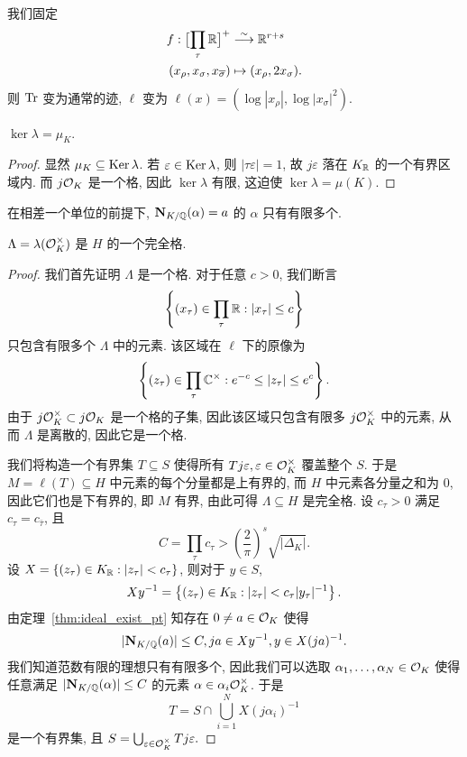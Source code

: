 我们固定
  \[\begin{split}
f:\bigl[\prod_\tau {\mathbb{R}}\bigr]^+&\stackrel{\sim}{\longrightarrow} {\mathbb{R}}^{r+s}\\
(x_\rho,x_\sigma,x_{\overline \sigma})&\mapsto (x_\rho,2x_\sigma).
\end{split}\]
则 ${\mathrm{Tr}}$ 变为通常的迹, $\ell$ 变为 $\ell(x)=(\log|x_\rho|,\log|x_\sigma|^2).$

\begin{proposition}{}{}
$\ker\lambda=\mu_K$.
\end{proposition}
\begin{proof}
显然 $\mu_K\subseteq {\mathrm{Ker}\,}\lambda$. 若 $\varepsilon\in{\mathrm{Ker}\,}\lambda$, 则 $|\tau \varepsilon|=1$, 故 $j\varepsilon$ 落在 $K_{\mathbb{R}}$ 的一个有界区域内. 而 $j{\mathcal{O}}_K$ 是一个格, 因此 $\ker\lambda$ 有限, 这迫使 $\ker\lambda=\mu(K)$.
\end{proof}

\begin{exercise}
在相差一个单位的前提下, ${\mathbf{N}}_{K/{\mathbb{Q}}}(\alpha)=a$ 的 $\alpha$ 只有有限多个.
\end{exercise}

\begin{theorem}{}{}
$\Lambda=\lambda({\mathcal{O}}_K^\times)$ 是 $H$ 的一个完全格.
\end{theorem}
\begin{proof}
我们首先证明 $\Lambda$ 是一个格. 对于任意 $c>0$, 我们断言 
  \[\left\{(x_\tau)\in\prod_\tau {\mathbb{R}}: |x_\tau|\le c\right\}\]
只包含有限多个 $\Lambda$ 中的元素. 该区域在 $\ell$ 下的原像为
  \[\left\{(z_\tau)\in\prod_\tau{\mathbb{C}}^\times: e^{-c}\le |z_\tau|\le e^c\right\}.\]
由于 $j{\mathcal{O}}_K^\times\subset j{\mathcal{O}}_K$ 是一个格的子集, 因此该区域只包含有限多 $j{\mathcal{O}}_K^\times$ 中的元素, 从而 $\Lambda$ 是离散的, 因此它是一个格.

我们将构造一个有界集 $T\subseteq S$ 使得所有 $Tj\varepsilon,\varepsilon\in {\mathcal{O}}_K^\times$ 覆盖整个 $S$. 于是 $M=\ell(T)\subseteq H$ 中元素的每个分量都是上有界的, 而 $H$ 中元素各分量之和为 $0$, 因此它们也是下有界的, 即 $M$ 有界, 由此可得 $\Lambda\subseteq H$ 是完全格. 设 $c_\tau>0$ 满足 $c_\tau=c_{\bar\tau}$, 且
  \[C=\prod_\tau c_\tau>\left(\frac{2}{\pi}\right)^s\sqrt{|\Delta_K|}.\]
设 $X=\left\{(z_\tau)\in K_{\mathbb{R}}: |z_\tau|<c_\tau\right\}$, 则对于 $y\in S$,
  \[Xy^{-1}=\left\{(z_\tau)\in K_{\mathbb{R}}: |z_\tau|<c_\tau|y_\tau|^{-1}\right\}.\]
由定理~\ref{thm:ideal_exist_pt} 知存在 $0\neq a\in{\mathcal{O}}_K$ 使得 
  \[|{\mathbf{N}}_{K/{\mathbb{Q}}}(a)|\le C, ja\in Xy^{-1}, y\in X(ja)^{-1}.\]
我们知道范数有限的理想只有有限多个, 因此我们可以选取 $\alpha_1,\dots,\alpha_N\in{\mathcal{O}}_K$ 使得任意满足 $|{\mathbf{N}}_{K/{\mathbb{Q}}}(\alpha)|\le C$ 的元素 $\alpha\in \alpha_i {\mathcal{O}}_K^\times$. 于是
  \[T=S\cap \bigcup_{i=1}^N X(j \alpha_i)^{-1}\]
是一个有界集, 且 $S=\bigcup_{\varepsilon\in{\mathcal{O}}_K^\times} Tj\varepsilon.$
\end{proof}

